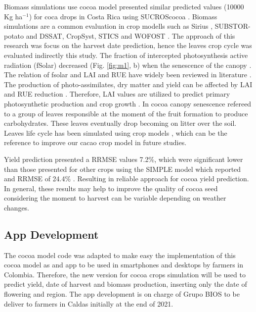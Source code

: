 \documentclass[gene,journal,article,submit,moreauthors,pdftex]{Definitions/mdpi}
\begin{document}
 
Biomass simulations use cocoa model presented similar predicted values (10000 Kg ha$^{-1}$) for coca drops in Costa Rica using SUCROScocoa \citep{zuidema2005}. Biomass simulations are a common evaluation in crop modells such as Sirius \citep{Crout20142}, SUBSTOR-potato \citep{Raymundo2017} and  DSSAT, CropSyst, STICS and WOFOST \citep{Confalonieri2016}. The approach of this research was focus  on the harvest date prediction, hence the leaves crop cycle was evaluated indirectly this study. The fraction of intercepted photosynthesis active radiation (fSolar) decreased (Fig. \ref{fig:m1}, b) when the senescence of the canopy \citep{zuidema2005}. The relation of fsolar and LAI \citep{lahive2019, Danner2015, Soltani2012, Romero2017, Vina2011, Baracaldo2014} and RUE \citep{Fletcher2013RUE,Bonhomme2000} have widely been reviewed in literature . The  production of photo-assimilates, dry matter and yield can be affected by LAI and RUE reduction \citep{Deblonde2001, Fletcher2013RUE,Bonhomme2000, Romero2017}. Therefore, LAI values are utilized to predict primary photosynthetic production and crop growth \cite{Romero2017, Soltani2012, zuidema2005,Baracaldo2014}. In cocoa canopy senescence  refereed to  a group of leaves responsible  at the moment of the fruit formation to produce carbohydrates. These leaves eventually drop becoming on litter over the soil. Leaves life cycle has been simulated using crop models \citep{Crout2010, zuidema2005}, which can be the reference to improve our cacao crop model in future studies.   

Yield prediction presented a RRMSE values 7.2\%, which were significant lower than those  presented for other crops using the SIMPLE model which reported and RRMSE of 24.4\% \citep{Zao2019simple}. Resulting in reliable approach for cocoa yield prediction. In general, these results may help to improve the quality of cocoa seed considering the moment to harvest can be variable depending on weather changes.  


\subsection{App Development}
The cocoa model code was adapted to make easy the implementation of this cocoa model as and app to be used in smartphones and desktops by farmers in Colombia. Therefore, the new version for cocoa crops simulation will be used to predict yield, date of harvest and biomass production, inserting only the date of flowering and region. The app development is on charge of Grupo BIOS to be deliver to farmers in Caldas initially at the end of 2021. 
\end{document}
